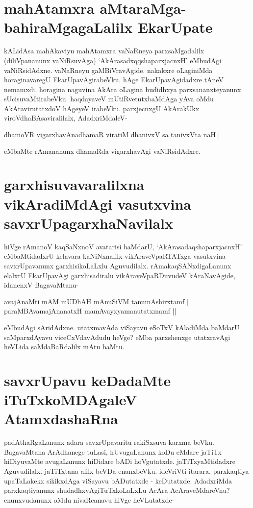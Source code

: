 \section*{mahAtamxra aMtaraMga-bahiraMgagaLalilx EkarUpate}

kALidAsa mahAkaviyu mahAtamxra vaNaRneya parxsaMgadalilx (diliVpananunx vaNiRsuvAga) `AkArasadxqqshaparxjacnxH' eMbudAgi vaNiRsidAdxne. vaNaRneyu gaMBiVravAgide. nakakxre oLaginiMda horaginavaregU EkarUpavAgirabeVku. hAge EkarUpavAgidadxre tAneV nemamxdi. horagina naguvina AkAra oLagina budidhxya parxsananxteyanunx sUcisuvaMtirabeVku. haqdayaveV mUtiRvetutxbaMdAga yAva oMdu AkAravirutatxdoV hAgeyeV irabeVku. parxjecnxgU AkArakUkx viroVdhaBAsaviralilalx, AdadxriMdaleV-

\begin{shloka}
dhamoVR vigarxhavAnadhamaR viratiM dhanivxV sa tanivxVta naH |\label{138}
\end{shloka}
eMbaMte rAmananunx dhamaRda vigarxhavAgi vaNiRsidAdxre.

\section*{garxhisuvavaralilxna vikAradiMdAgi vasutxvina savxrUpagarxhaNavilalx}

hiVge rAmanoV kaqSaNxnoV avatarisi baMdarU, `AkArasadaqshaparxjacnxH'\label{139a} eMbaMtidadxrU kelavara kaNiNxnalilx vikAraveVpaRTATxga vasutxvina savxrUpavanunx garxhisikoLaLxlu Aguvudilalx. rAmakaqSANxdigaLanunx elalxrU EkarUpavAgi garxhisadiralu vikAraveVpaRDuvudeV kAraNavAgide, idanenxV BagavaMtanu-

\begin{shloka}
avajAnaMti mAM mUDhAH mAnuSiVM tanumAshirxtamf |\label{139}\\
paraMBAvamajAnanatxH mamAvayxyamanutatxmamf ||
\end{shloka}

eMbudAgi sAridAdxne. utatxmavAda viSayavu eSoTxV kAladiMda baMdarU saMparxdAyavu viceCxVdavAdudu heVge? eMba parxshenxge utatxravAgi heVLida saMdaBaRdalilx mAtu baMtu.

\section*{savxrUpavu keDadaMte iTuTxkoMDAgaleV AtamxdashaRna}

padAthaRgaLanunx adara savxrUpavaritu rakiSxsuva karxma beVku. BagavaMtana ArAdhanege tuLasi, hUvugaLanunx koDu eMdare jaTiTx hiDiyuvaMte avugaLanunx hiDidare bADi hoVgutatxde. jaTiTxyaMtidadxre Aguvudilalx. jaTiTxtana alilx beVDa enanxbeVku. ideVriVti itarara, parxkaqtiya upaTaLakekx sikikxdAga viSayavu bADutatxde - keDutatxde. AdadxriMda parxkaqtiyanunx shudadhxvAgiTuTxkoLaLxLu AcAra AcAraveMdareVnu? enunxvudanunx oMdu nivaRcanavu hiVge heVLutatxde-


